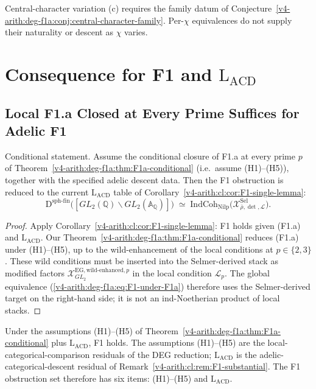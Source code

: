 Central-character variation (c) requires the family datum of
Conjecture~\ref{v4-arith:deg-f1a:conj:central-character-family}.
Per-\(\chi\) equivalences do not supply their naturality or descent
as \(\chi\) varies.

\section{Consequence for F1 and \(\mathrm{L}_{\mathrm{ACD}}\)}
\label{v4-arith:deg-f1a:global-check}

\subsection{Local F1.a Closed at Every Prime Suffices for Adelic F1}

\begin{theorem}
\label{v4-arith:deg-f1a:thm:F1-adelic-check}
Conditional statement. Assume the conditional closure of F1.a at
every prime \(p\) of
Theorem~\ref{v4-arith:deg-f1a:thm:F1a-conditional} (i.e.\ assume (H1)--(H5)), together with the specified adelic
descent data. Then the F1 obstruction is reduced to the current
\(\mathrm{L}_{\mathrm{ACD}}\) table of
Corollary~\ref{v4-arith:cl:cor:F1-single-lemma}:
\begin{equation}
\label{v4-arith:deg-f1a:eq:F1-under-F1a}
\mathrm{D}^{\mathrm{sph\text{-}fin}}\bigl([GL_{2}(\mathbb{Q})\backslash GL_{2}(\mathbb{A}_{\mathbb{Q}})]\bigr)\;\simeq\;\mathrm{IndCoh}_{\mathrm{Nilp}}\bigl(\mathcal{X}^{\mathrm{Sel}}_{\bar\rho,\det,\mathcal{L}}\bigr).
\end{equation}
\end{theorem}

\begin{proof}
Apply Corollary~\ref{v4-arith:cl:cor:F1-single-lemma}: F1 holds given
(F1.a) and \(\mathrm{L}_{\mathrm{ACD}}\). Our
Theorem~\ref{v4-arith:deg-f1a:thm:F1a-conditional} reduces (F1.a) under
(H1)--(H5), up to the wild-enhancement of the local conditions
at \(p\in\{2,3\}\). These wild conditions must be inserted into the
Selmer-derived stack as modified factors
\(\mathcal{X}^{\mathrm{EG,wild\text{-}enhanced},p}_{GL_{2}}\) in the
local condition \(\mathcal{L}_{p}\). The global equivalence
(\ref{v4-arith:deg-f1a:eq:F1-under-F1a}) therefore uses the
Selmer-derived target on the right-hand side; it is not an
ind-Noetherian product of local stacks.
\end{proof}

\begin{remark}
\label{v4-arith:deg-f1a:rem:global-three-pieces}
Under the assumptions (H1)--(H5) of
Theorem~\ref{v4-arith:deg-f1a:thm:F1a-conditional} plus
\(\mathrm{L}_{\mathrm{ACD}}\), F1 holds. The assumptions
(H1)--(H5) are the local-categorical-comparison residuals
of the DEG reduction; \(\mathrm{L}_{\mathrm{ACD}}\) is the adelic-categorical-descent
residual of Remark~\ref{v4-arith:cl:rem:F1-substantial}. The F1 obstruction
set therefore has six items: (H1)--(H5) and
\(\mathrm{L}_{\mathrm{ACD}}\).
\end{remark}

